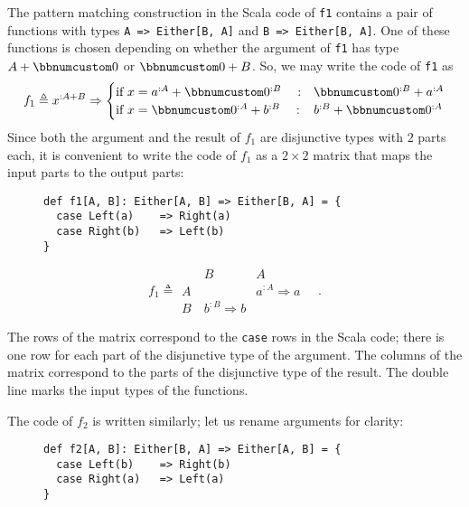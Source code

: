 The pattern matching construction in the Scala code of \lstinline!f1!
contains a pair of functions with types \lstinline!A => Either[B, A]!
and \lstinline!B => Either[B, A]!. One of these functions is chosen
depending on whether the argument of \lstinline!f1! has type $A+\bbnum 0$
or $\bbnum 0+B$. So, we may write the code of \lstinline!f1! as
\[
f_{1}\triangleq x^{:A+B}\Rightarrow\begin{cases}
\text{if }x=a^{:A}+\bbnum 0^{:B}\quad: & \bbnum 0^{:B}+a^{:A}\\
\text{if }x=\bbnum 0^{:A}+b^{:B}\quad: & b^{:B}+\bbnum 0^{:A}
\end{cases}
\]
Since both the argument and the result of $f_{1}$ are disjunctive
types with $2$ parts each, it is convenient to write the code of
$f_{1}$ as a $2\times2$ matrix that maps the input parts to the
output parts:\begin{wrapfigure}{l}{0.5\columnwidth}%
\vspace{-0.5\baselineskip}
\begin{lstlisting}
def f1[A, B]: Either[A, B] => Either[B, A] = {
  case Left(a)    => Right(a)
  case Right(b)   => Left(b)
}
\end{lstlisting}
\vspace{-2\baselineskip}
\end{wrapfigure}%
\vspace{-0.6\baselineskip}
\[
f_{1}\triangleq\begin{array}{|c||cc|}
 & B & A\\
\hline A~ &  & a^{:A}\Rightarrow a\\
B~ & b^{:B}\Rightarrow b & 
\end{array}\quad.
\]
\vspace{-0.5\baselineskip}

The rows of the matrix correspond to the \lstinline!case! rows in
the Scala code; there is one row for each part of the disjunctive
type of the argument. The columns of the matrix correspond to the
parts of the disjunctive type of the result.
The double line marks the input types of the functions.

The code of $f_{2}$ is written similarly; let us rename arguments
for clarity:\hfill{}~\begin{wrapfigure}[4]{l}{0.5\columnwidth}%
\vspace{-0.7\baselineskip}
\begin{lstlisting}
def f2[A, B]: Either[B, A] => Either[A, B] = {
  case Left(b)    => Right(b)
  case Right(a)   => Left(a)
}
\end{lstlisting}
\vspace{-1.5\baselineskip}
\end{wrapfigure}%

